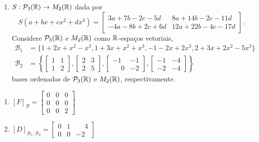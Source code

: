 \documentclass[12pt]{exam}
\begin{document}
\begin{exercicio}
\begin{enumerate}[label={\alph*})]
        \item $S : \mathcal{P}_3(\mathbb{R}) \to M_2(\mathbb{R})$ dada por
        \[
        S(a + bx + cx^2 + dx^3) = \begin{bmatrix}
            3a + 7b - 2c - 5d & 8a + 14b - 2c - 11d\\
            -4a - 8b + 2c + 6d & 12a + 22b - 4c - 17d
        \end{bmatrix}.
        \]
        Considere $\mathcal{P}_3(\mathbb{R})$ e $M_2(\mathbb{R})$ como $\mathbb{R}$-espaços vetoriais,
        \begin{align*}
            \mathcal{B}_1 &= \{1 + 2x + x^2 - x^3, 1 + 3x + x^2 + x^3, -1 - 2x + 2x^3, 2 + 3x + 2x^2 - 5x^3\}\\
            \mathcal{B}_2 &= \left\{\begin{bmatrix}
                1 & 1\\1 & 2
            \end{bmatrix}, \begin{bmatrix}
                2 & 3\\2 & 5
            \end{bmatrix}, \begin{bmatrix}
                -1 & -1\\\phantom{-}0 & -2
            \end{bmatrix}, \begin{bmatrix}
                -1 & -4\\-2 & -4
            \end{bmatrix}\right\}
        \end{align*}
        bases ordenadas de $\mathcal{P}_3(\mathbb{R})$ e $M_2(\mathbb{R})$, respectivamente.
    \end{enumerate}
    \begin{solucao}
        \begin{enumerate}[label={\alph*})]
            \item $[F]_\mathcal{B} = \begin{bmatrix}
                0 & 0 & 0\\
                0 & 0 & 0\\
                0 & 0 & 2
            \end{bmatrix}$

            \item $[D]_{\mathcal{B}_1, \mathcal{B}_2} = \begin{bmatrix}
                0 & 1 & \phantom{-}4\\
                0 & 0 & -2
            \end{bmatrix}$


\end{enumerate}
\end{solucao}
\end{exercicio}
\end{document}
